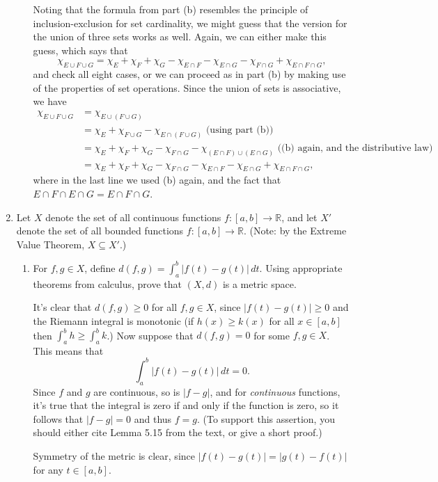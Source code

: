 \documentclass[letterpaper,12pt]{article}
\newcommand{\abs}[1]{\lvert #1\rvert}
\newcommand{\R}{\mathbb{R}}
\begin{document}
\begin{enumerate}
\begin{enumerate}
Noting that the formula from part (b) resembles the principle of inclusion-exclusion for set cardinality, we might guess that the version for the union of three sets works as well. Again, we can either make this guess, which says that
\[
 \chi_{E\cup F\cup G} = \chi_E+\chi_F+\chi_G-\chi_{E\cap F}-\chi_{E\cap G}-\chi_{F\cap G}+\chi_{E\cap F\cap G},
\]
and check all eight cases, or we can proceed as in part (b) by making use of the properties of set operations. Since the union of sets is associative, we have
\begin{align*}
 \chi_{E\cup F\cup G} & = \chi_{E\cup (F\cup G)}\\
& = \chi_E+\chi_{F\cup G}-\chi_{E\cap (F\cup G)} \text{ (using part (b))}\\
& = \chi_E+\chi_F+\chi_G-\chi_{F\cap G}-\chi_{(E\cap F)\cup (E\cap G)} \text{ ((b) again, and the distributive law)}\\
& = \chi_E+\chi_F+\chi_G-\chi_{F\cap G}-\chi_{E\cap F}-\chi_{E\cap G}+\chi_{E\cap F\cap G},
\end{align*}
where in the last line we used (b) again, and the fact that $E\cap F\cap E\cap G = E\cap F\cap G$.

\end{enumerate}
\item Let $X$ denote the set of all continuous functions $f:[a,b]\to\R$, and let $X'$ denote the set of all bounded functions $f:[a,b]\to\R$. (Note: by the Extreme Value Theorem, $X\subseteq X'$.)

\begin{enumerate}
 \item For $f,g\in X$, define $d(f,g) = \int_a^b\abs{f(t)-g(t)}\,dt$. Using appropriate theorems from calculus, prove that $(X,d)$ is a metric space.

\bigskip

It's clear that $d(f,g)\geq 0$ for all $f,g\in X$, since $\abs{f(t)-g(t)}\geq 0$ and the Riemann integral is monotonic (if $h(x)\geq k(x)$ for all $x\in [a,b]$ then $\int_a^b h\geq \int_a^b k$.) Now suppose that $d(f,g)=0$ for some $f,g\in X$. This means that
\[
 \int_a^b\abs{f(t)-g(t)}\,dt = 0.
\]
Since $f$ and $g$ are continuous, so is $\abs{f-g}$, and for {\em continuous} functions, it's true that the integral is zero if and only if the function is zero, so it follows that $\abs{f-g}=0$ and thus $f=g$. (To support this assertion, you should either cite Lemma 5.15 from the text, or give a short proof.)

Symmetry of the metric is clear, since $\abs{f(t)-g(t)}=\abs{g(t)-f(t)}$ for any $t\in [a,b]$.



\end{enumerate}
\end{enumerate}
\end{document}
